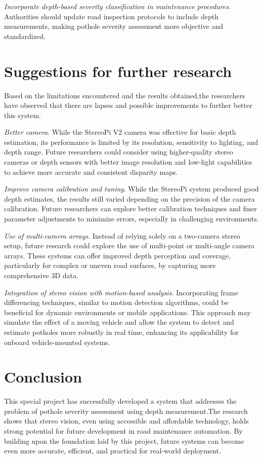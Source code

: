 \textit{Incorporate depth-based severity classification in maintenance procedures}. Authorities should update road inspection protocols to include depth measurements, making pothole severity assessment more objective and standardized.


\section{Suggestions for further research}

Based on the limitations encountered and the results obtained,the researchers have
observed that there are lapses and possible improvements to further better this system.

\textit{Better camera}. While the StereoPi V2 camera was effective for basic depth estimation, its performance is limited by its resolution, sensitivity to lighting, and depth range. Future researchers could consider using higher-quality stereo cameras or depth sensors with better image resolution and low-light capabilities to achieve more accurate and consistent disparity maps.
	
\textit{Improve camera calibration and tuning}. While the StereoPi system produced good depth estimates, the results still varied depending on the precision of the camera calibration. Future researchers can explore better calibration techniques and finer parameter adjustments to minimize errors, especially in challenging environments.

\textit{Use of multi-camera arrays.} Instead of relying solely on a two-camera stereo setup, future research could explore the use of multi-point or multi-angle camera arrays. These systems can offer improved depth perception and coverage, particularly for complex or uneven road surfaces, by capturing more comprehensive 3D data.

\textit{Integration of stereo vision with motion-based analysis.} Incorporating frame differencing techniques, similar to motion detection algorithms, could be beneficial for dynamic environments or mobile applications. This approach may simulate the effect of a moving vehicle and allow the system to detect and estimate potholes more robustly in real time, enhancing its applicability for onboard vehicle-mounted systems.


\section{Conclusion}
This special project has successfully developed a system that addresses the problem of pothole severity assessment using depth measurement.The research shows that stereo vision, even using accessible and affordable technology, holds strong potential for future development in road maintenance automation. By building upon the foundation laid by this project, future systems can become even more accurate, efficient, and practical for real-world deployment.